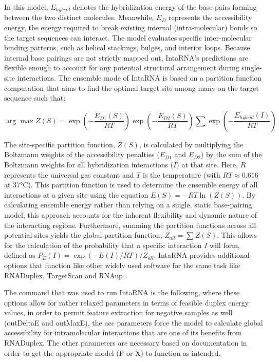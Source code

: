 \documentclass[en,ack]{dimscthesis}
\begin{document}
\par In this model, $E_{hybrid}$ denotes the hybridization energy of the base pairs forming between the two distinct molecules. Meanwhile, $E_D$ represents the accessibility energy, the energy required to break existing internal (intra-molecular) bonds so the target sequences can interact. The model evaluates specific inter-molecular binding patterns, such as helical stackings, bulges, and interior loops. Because internal base pairings are not strictly mapped out, IntaRNA's predictions are flexible enough to account for any potential structural arrangement during single-site interactions. The ensemble mode of IntaRNA is based on a partition function computation that aims to find the optimal target site among many on the target sequence such that:

\begin{equation}
	\arg\max Z(S) = \exp\left(-\frac{E_{D1}(S)}{RT}\right) \exp\left(-\frac{E_{D2}(S)}{RT}\right) \sum \exp\left(-\frac{E_{hybrid}(I)}{RT}\right)
\end{equation}

\par The site-specific partition function, $Z(S)$, is calculated by multiplying the Boltzmann weights of the accessibility penalties ($E_{D1}$ and $E_{D2}$) by the sum of the Boltzmann weights for all hybridization interactions ($I$) at that site. Here, $R$ represents the universal gas constant and $T$ is the temperature (with $RT \approx 0.616$ at 37°C). This partition function is used to determine the ensemble energy of all interactions at a given site using the equation $E(S) = -RT \ln(Z(S))$. By calculating ensemble energy rather than relying on a single, static base-pairing model, this approach accounts for the inherent flexibility and dynamic nature of the interacting regions. Furthermore, summing the partition functions across all potential sites yields the global partition function, $Z_{all} = \sum Z(S)$. This allows for the calculation of the probability that a specific interaction $I$ will form, defined as $P_E(I) = \exp(-E(I)/RT) / Z_{all}$. IntaRNA provides additional options that function like other widely used software for the same task like RNADuplex, TargetScan and RNAup \parencite{lorenzViennaRNAPackage202011,hofackerFastFoldingComparison1994,lorenzRNAFoldingHard2016,turnerNNDBNearestNeighbor2010}.

\par The command that was used to run IntaRNA is the following, where these options allow for rather relaxed parameters in terms of feasible duplex energy values, in order to permit feature extraction for negative samples as well (outDeltaE and outMaxE), the acc parameters force the model to calculate global accessibility for intramolecular interactions that are one of its benefits from RNADuplex. The other parameters are necessary based on documentation in order to get the appropriate model (P or X) to function as intended.
\end{document}
